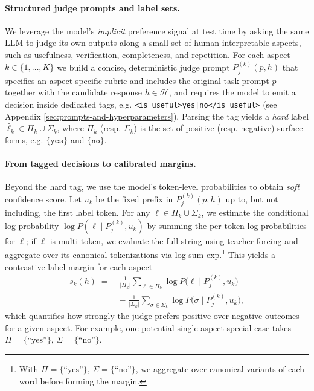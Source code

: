 \documentclass{article}
\theoremstyle{plain}
\theoremstyle{definition}
\theoremstyle{remark}
\begin{document}
\paragraph{Structured judge prompts and label sets.} We leverage the model’s \emph{implicit} preference signal at test time by asking the same LLM to judge its own outputs along a small set of human-interpretable aspects, such as usefulness, verification, completeness, and repetition. For each aspect \(k\in\{1,\dots,K\}\) we build a concise, deterministic judge prompt \(P^{(k)}_j(p,h)\) that specifies an aspect‑specific rubric and includes the original task prompt \(p\) together with the candidate response \(h\in\mathcal{H}\), and requires the model to emit a decision inside dedicated tags, e.g. \texttt{<is\_useful>yes|no</is\_useful>} (see Appendix \cref{sec:prompts-and-hyperparameters}). Parsing the tag yields a \emph{hard} label \(\hat\ell_k\in\Pi_k\cup\Sigma_k\), where \(\Pi_k\) (resp. \(\Sigma_k\)) is the set of positive (resp. negative) surface forms, e.g. \(\{\texttt{yes}\}\) and \(\{\texttt{no}\}\).

\paragraph{From tagged decisions to calibrated margins.} Beyond the hard tag, we use the model’s token‑level probabilities to obtain \emph{soft} confidence score. Let \(u_k\) be the fixed prefix in \(P^{(k)}_j(p,h)\) up to, but not including, the first label token. For any \(\ell\in\Pi_k\cup\Sigma_k\), we estimate the conditional log‑probability \(\log P(\ell\mid P^{(k)}_j,u_k)\) by summing the per‑token log‑probabilities for \(\ell\); if \(\ell\) is multi‑token, we evaluate the full string using teacher forcing and aggregate over its canonical tokenizations via log‑sum‑exp.\footnote{With \(\Pi=\{\text{``yes''}\},\,\Sigma=\{\text{``no''}\}\), we aggregate over canonical variants of each word before forming the margin.} This yields a contrastive label margin for each aspect
\[
  \begin{aligned}
    s_k(h)\;=\;&\frac{1}{|\Pi_k|}\sum_{\ell\in\Pi_k}\log P\!\bigl(\ell\mid P^{(k)}_j,u_k\bigr)\\
    &-\;\frac{1}{|\Sigma_k|}\sum_{\sigma\in\Sigma_k}\log P\!\bigl(\sigma\mid P^{(k)}_j,u_k\bigr),
  \end{aligned}
\]
which quantifies how strongly the judge prefers positive over negative outcomes for a given aspect. For example, one potential single‑aspect special case takes \(\Pi=\{\text{``yes''}\},\,\Sigma=\{\text{``no''}\}\).
\end{document}
